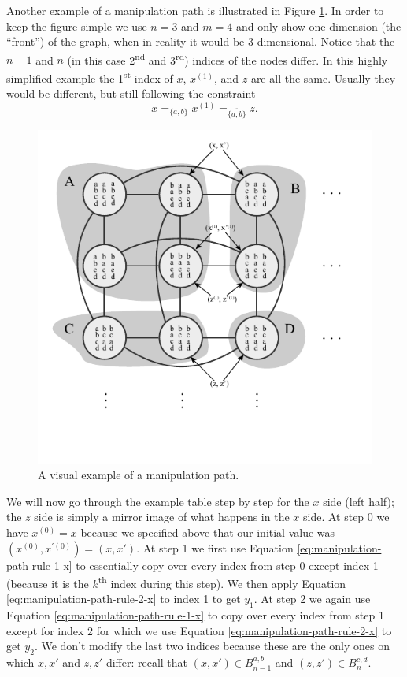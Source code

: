	Another example of a manipulation path is illustrated in Figure \ref{fig:manipulation-path}. In order to keep the figure simple we use $n = 3$ and $m = 4$ and only show one dimension (the ``front'') of the graph, when in reality it would be 3-dimensional. Notice that the $n - 1$ and $n$ (in this case 2\textsuperscript{nd} and 3\textsuperscript{rd}) indices of the nodes differ. In this highly simplified example the 1\textsuperscript{st} index of $x$, $x^{(1)}$, and $z$ are all the same. Usually they would be different, but still following the constraint
	\[
		x =_{\{a, b\}} x^{(1)} =_{\overline{\{a, b\}}} z.
	\]
	\begin{figure}[ht]
		\begin{center}
			\includegraphics[width=5in]{../figures/diagram7.pdf}
			\caption{A visual example of a manipulation path.}
			\label{fig:manipulation-path}
		\end{center}
	\end{figure}


	We will now go through the example table step by step for the $x$ side (left half); the $z$ side is simply a mirror image of what happens in the $x$ side. At step 0 we have $x^{(0)} = x$ because we specified above that our initial value was $(x^{(0)}, x^{\prime(0)}) = (x,x')$. At step 1 we first use Equation \ref{eq:manipulation-path-rule-1-x} to essentially copy over every index from step 0 except index 1 (because it is the $k$\textsuperscript{th} index during this step). We then apply Equation \ref{eq:manipulation-path-rule-2-x} to index 1 to get $y_1$. At step 2 we again use Equation \ref{eq:manipulation-path-rule-1-x} to copy over every index from step 1 except for index 2 for which we use Equation \ref{eq:manipulation-path-rule-2-x} to get $y_2$. We don't modify the last two indices because these are the only ones on which $x, x'$ and $z, z'$ differ: recall that $(x, x') \in B_{n-1}^{a,b}$ and $(z, z') \in B_{n}^{c,d}$.

